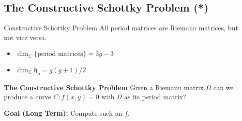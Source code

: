 \documentclass{beamer}
\DeclareMathOperator{\CC}{\mathbb{C}}
\begin{document}


\subsection{The Constructive Schottky Problem (*)}



\begin{frame}{Constructive Schottky Problem}{}
  All period matrices are Riemann matrices, but not vice versa.
  \begin{itemize}
    \item $\dim_{\CC} \{ \text{period matrices} \} = 3g-3$
    \item $\dim_{\CC} \mathfrak{h}_g = g(g+1)/2$
  \end{itemize}

  \vspace{16pt}

  \begin{block}{\bf The Constructive Schottky Problem}
    Given a Riemann matrix $\Omega$ can we produce a curve $C : f(x,y) =
    0$ with $\Omega$ as its period matrix?
  \end{block}

  \vspace{16pt}

  {\bf Goal (Long Term):} Compute such an $f$.
\end{frame}


\begin{frame}
\end{frame}
\end{document}

